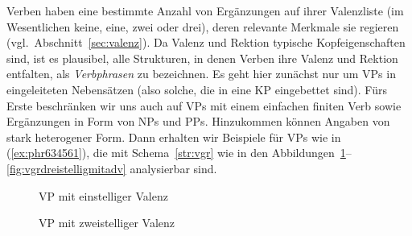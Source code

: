 \label{sec:verbphrase}


Verben haben eine bestimmte Anzahl von Ergänzungen auf ihrer Valenzliste (im Wesentlichen keine, eine, zwei oder drei), deren relevante Merkmale sie regieren (vgl.\ Abschnitt~\ref{sec:valenz}).
Da Valenz und Rektion typische Kopfeigenschaften sind, ist es plausibel, alle Strukturen, in denen Verben ihre Valenz und Rektion entfalten, als \textit{Verbphrasen} zu bezeichnen.
Es geht hier zunächst nur um VPs in eingeleiteten Nebensätzen (also solche, die in eine KP eingebettet sind).
Fürs Erste beschränken wir uns auch auf VPs mit einem einfachen finiten Verb sowie Ergänzungen in Form von NPs und PPs.
Hinzukommen können Angaben von stark heterogener Form.
Dann erhalten wir Beispiele für VPs wie in (\ref{ex:phr634561}), die mit Schema~\ref{str:vgr} wie in den Abbildungen~\ref{fig:vgreinstellig}--\ref{fig:vgrdreistelligmitadv} analysierbar sind.



\begin{exe}
\ex\label{ex:phr634561}\begin{xlist}
\end{xlist} 
\end{exe}

\begin{figure}[!htbp]
  \centering
  \caption{VP mit einstelliger Valenz}
  \label{fig:vgreinstellig}
\end{figure}

\begin{figure}[!htbp]
  \centering
  \caption{VP mit zweistelliger Valenz}
  \label{fig:vgrzweistellig}
\end{figure}

